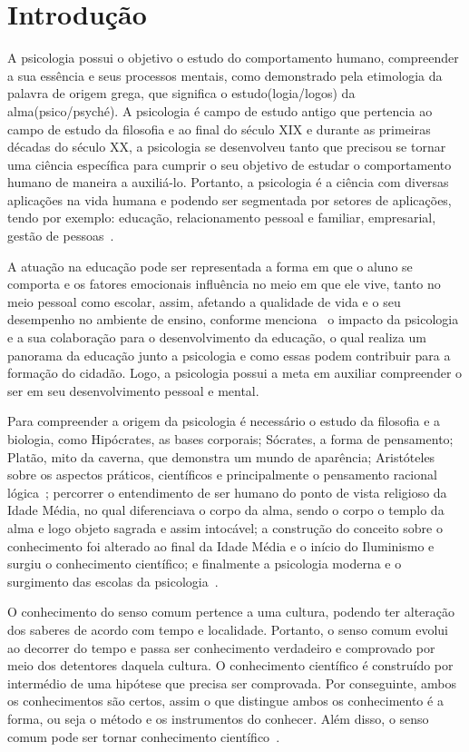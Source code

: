\section{Introdução}\label{intro}


A psicologia possui o objetivo o estudo do comportamento humano, compreender a sua
essência e seus processos mentais, como demonstrado pela etimologia da palavra de origem grega, que significa o estudo(logia/logos) da alma(psico/psyché). 
A psicologia é campo de estudo antigo que pertencia ao campo de estudo da filosofia e ao final do século XIX e durante as primeiras décadas do século XX, a psicologia se desenvolveu tanto que precisou se tornar uma ciência específica para cumprir o seu objetivo de estudar o comportamento humano de maneira a auxiliá-lo. 
Portanto, a psicologia é a ciência com diversas aplicações na vida humana e podendo ser segmentada por setores de aplicações, tendo por exemplo: educação, relacionamento pessoal e familiar, empresarial, gestão de pessoas~\cite{freitas2008historia}.

A atuação na educação pode ser representada a forma em que o aluno se comporta e os fatores emocionais influência no meio em que ele vive, tanto no meio pessoal como escolar, assim, afetando a qualidade de vida e o seu desempenho no ambiente de ensino, conforme menciona~ o impacto da psicologia e a sua colaboração para o desenvolvimento da educação, o qual realiza um panorama da educação junto a psicologia e como essas podem contribuir para a formação do cidadão.
Logo, a psicologia possui a meta em auxiliar compreender o ser em seu desenvolvimento pessoal e mental. 

Para compreender a origem da psicologia é necessário o estudo da filosofia e a biologia, como Hipócrates, as bases corporais; Sócrates, a forma de pensamento; Platão, mito da caverna, que demonstra um mundo de aparência; Aristóteles sobre os aspectos práticos, científicos e principalmente o pensamento racional lógica~\cite{marcondes1997filosofia}; percorrer o entendimento de ser humano do ponto de vista religioso da Idade Média, no qual diferenciava o corpo da alma, sendo o corpo o templo da alma e logo objeto sagrada e assim intocável; a construção do conceito sobre o conhecimento foi alterado ao final da Idade Média e o início do Iluminismo e surgiu o conhecimento científico; e finalmente a psicologia moderna e o surgimento das escolas da psicologia~\cite{bock1999psicologias,freitas2008historia}. 

O conhecimento do senso comum pertence a uma cultura, podendo ter alteração dos saberes de acordo com tempo e localidade.
Portanto, o senso comum evolui ao decorrer do tempo e passa ser conhecimento verdadeiro e comprovado por meio dos detentores daquela cultura.
O conhecimento científico é construído por intermédio de uma hipótese que precisa ser comprovada. 
Por conseguinte, ambos os conhecimentos são certos, assim o que distingue ambos os conhecimento é a forma, ou seja o método e os instrumentos do conhecer.
Além disso, o senso comum pode ser tornar conhecimento científico~\cite{marconi2003mep}.  

